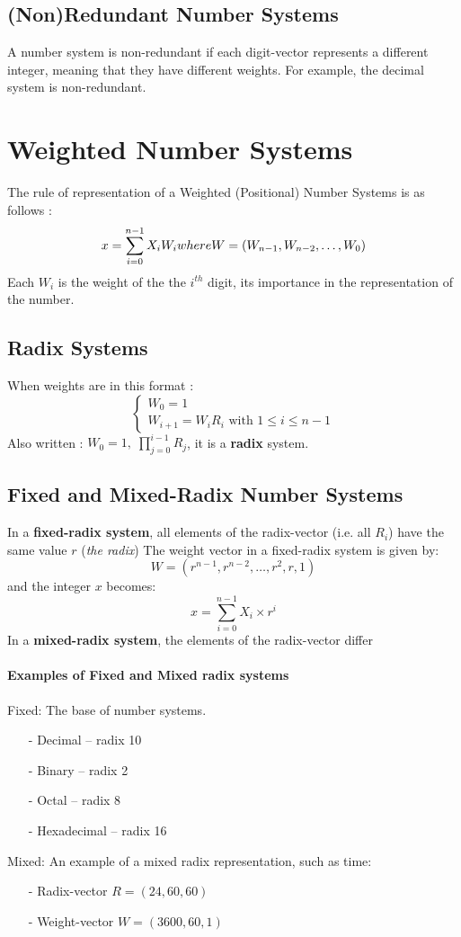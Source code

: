 \documentclass[10pt,a4paper]{book}
\begin{document}
\subsection{(Non)Redundant Number Systems}
A number system is non-redundant if each digit-vector represents a different integer, meaning that they have different weights. For example, the decimal system is non-redundant.

\section{Weighted Number Systems}
The rule of representation of a Weighted (Positional) Number Systems is as follows :
\[x = \sum_{i=0}^{n-1} X_{i}W_{i}$$ where $$W = (W_{n-1}, W_{n-2}, \dots, W_{0})\]
Each $W_i$ is the weight of the the $i^{th}$ digit, its importance in the representation of the number.

\subsection{Radix Systems}
When weights are in this format : 
\begin{equation}
    \begin{cases}
        W_{0} = 1\\
        W_{i+1} = W_{i}R_{i}\text{ with } 1\leq i\leq n-1
    \end{cases}
\end{equation}
Also written : $W_{0} = 1, \; \prod_{j=0}^{i-1} R_{j}$, it is a \textbf{radix} system.
	
\subsection{Fixed and Mixed-Radix Number Systems}
In a \textbf{fixed-radix system}, all elements of the radix-vector (i.e. all $R_i$) have the same value \( r \) (\textit{the radix})
The weight vector in a fixed-radix system is given by:
\[W = \left( r^{n-1}, r^{n-2}, \ldots, r^2, r, 1 \right)\]
and the integer $x$ becomes:
\[x = \sum_{i=0}^{n-1} X_i \times r^i\]
In a \textbf{mixed-radix system}, the elements of the radix-vector differ
\paragraph{Examples of Fixed and Mixed radix systems}
$ $\\
Fixed: The base of number systems.
\begin{itemize}
	\item[-] Decimal – radix 10
	\item[-] Binary – radix 2
	\item[-] Octal – radix 8
	\item[-] Hexadecimal – radix 16
\end{itemize}
Mixed: An example of a mixed radix representation, such as time:
\begin{itemize}
	\item[-] Radix-vector \(R = (24, 60, 60)\)
	\item[-] Weight-vector \(W = (3600, 60, 1)\)
\end{itemize}
\end{document}
